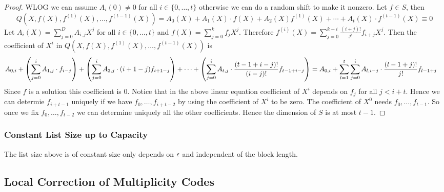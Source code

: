\begin{proof}
WLOG we can assume $A_i(0)\neq 0$ for all $i\in\{0,\dots, t\}$ otherwise we can do a random shift to make it nonzero. Let $f\in S$, then $$Q(X,f(X),f^{(1)}(X),\dots, f^{(t-1)}(X))=A_0(X)+A_1(X)\cdot f(X)+A_2(X)f^{(1)}(X)+\cdots +A_t(X)\cdot f^{(t-1)}(X)\equiv 0$$Let $A_i(X)=\sum\limits_{j=0}^D A_{i,j}X^j$ for all $i\in\{0,\dots, t\}$ and $f(X)=\sum\limits_{j=0}^k f_j X^j$. Therefore $f^{(i)}(X)=\sum\limits_{j=0}^{k-i}\frac{(i+j)!}{j!}f_{i+j}X^j$. Then the coefficient of $X^i$ in $Q(X,f(X),f^{(1)}(X),\dots, f^{(t-1)}(X))$ is \begin{align*}
    &A_{0,i}+\left(\sum\limits_{j=0}^iA_{1,j}\cdot f_{i-j}\right)+\left( \sum\limits_{j=0}^i A_{2,j}\cdot  (i+1-j)f_{i+1-j} \right)+\cdots + \left( \sum\limits_{j=0}^i A_{t,j}\cdot \frac{(t-1+i-j)!}{(i-j)!}f_{t-1+i-j} \right)= A_{0,i}+\sum\limits_{l=1}^{t}\sum\limits_{j=0}^i A_{l,i-j}\cdot \frac{(l-1+j)!}{j!}f_{l-1+j}
\end{align*}Since $f$ is a solution this coefficient is $0$. Notice that in the above linear equation coefficient of $X^i$ depends on $f_j$ for all $j<i+t$. Hence we can determie $f_{i+t-1}$ uniquely if we have $f_0,\dots, f_{i+t-2}$ by using the coefficient of $X^i$ to be zero. The coefficient of $X^0$ needs $f_0,\dots, f_{t-1}$. So once we fix $f_0,\dots, f_{t-2}$ we can determine uniquely all the other coefficients. Hence the dimension of $S$ is at most $t-1$.
\end{proof}


\subsubsection{Constant List Size up to Capacity}

\begin{Theorem}{\cite{KoppartyRonZewiSarafWootters_2018_IDo_CONF}}{}
The list size above is of constant size only depends on $\epsilon$ and independent of the block length.
\end{Theorem}
\subsection{Local Correction of Multiplicity Codes}